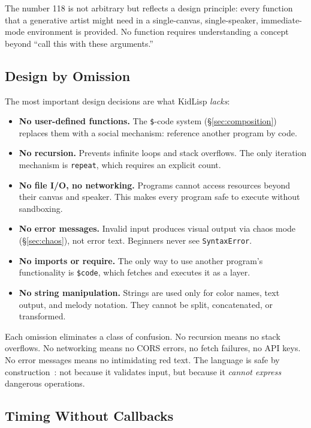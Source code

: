 \documentclass[sigconf,nonacm]{acmart}
\begin{document}
The number 118 is not arbitrary but reflects a design principle: every function that a generative artist might need in a single-canvas, single-speaker, immediate-mode environment is provided. No function requires understanding a concept beyond ``call this with these arguments.''

\subsection{Design by Omission}

The most important design decisions are what KidLisp \emph{lacks}:

\begin{itemize}
  \item \textbf{No user-defined functions.} The \texttt{\$}-code system (\S\ref{sec:composition}) replaces them with a social mechanism: reference another program by code.
  \item \textbf{No recursion.} Prevents infinite loops and stack overflows. The only iteration mechanism is \texttt{repeat}, which requires an explicit count.
  \item \textbf{No file I/O, no networking.} Programs cannot access resources beyond their canvas and speaker. This makes every program safe to execute without sandboxing.
  \item \textbf{No error messages.} Invalid input produces visual output via chaos mode (\S\ref{sec:chaos}), not error text. Beginners never see \texttt{SyntaxError}.
  \item \textbf{No imports or require.} The only way to use another program's functionality is \texttt{\$code}, which fetches and executes it as a layer.
  \item \textbf{No string manipulation.} Strings are used only for color names, text output, and melody notation. They cannot be split, concatenated, or transformed.
\end{itemize}

Each omission eliminates a class of confusion. No recursion means no stack overflows. No networking means no CORS errors, no fetch failures, no API keys. No error messages means no intimidating red text. The language is safe by construction~\cite{felleisen2018htdp}: not because it validates input, but because it \emph{cannot express} dangerous operations.

\subsection{Timing Without Callbacks}
\end{document}
